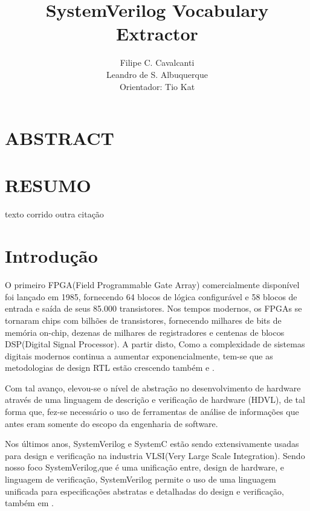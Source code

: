 \documentclass[12pt, twocolumn, a4paper]{article}
\begin{document}
	\title{SystemVerilog Vocabulary Extractor}
	\author{Filipe C. Cavalcanti\\ Leandro de S. Albuquerque\\
	Orientador: Tio Kat}
	\maketitle
	
	\section{ABSTRACT}
	
	\section{RESUMO}
	texto corrido\cite{Antoniol2007}
	outra citação\cite{Alfke1943}
	\section{Introdução}
\quad O primeiro FPGA(Field Programmable Gate Array) comercialmente disponível  foi lançado em 1985, fornecendo 64 blocos de lógica configurável e 58 blocos de entrada e saída de seus 85.000 transistores\cite{Alfke1943}. Nos tempos modernos, os FPGAs se tornaram chips com bilhões de transistores, fornecendo milhares de bits de memória on-chip, dezenas de milhares de registradores e centenas de blocos DSP(Digital Signal Processor)\cite{Marc-Andre}. A partir disto, Como a complexidade de sistemas digitais modernos continua a aumentar exponencialmente, tem-se que as metodologias de design RTL estão crescendo também\cite{Marc-Andre} e \cite{Hahanov2008}.

Com tal avanço, elevou-se o nível de abstração no desenvolvimento de hardware através de uma linguagem de descrição e verificação de hardware (HDVL), de tal forma que, fez-se necessário o uso de ferramentas de análise de informações que antes eram somente do escopo da engenharia de software.

Nos últimos anos, SystemVerilog e SystemC estão sendo extensivamente usadas para design e verificação na industria VLSI(Very Large Scale Integration)\cite{Kumar2014}. Sendo nosso foco SystemVerilog,que é uma unificação entre, design de hardware, e linguagem de verificação\cite{IEEEComputerSociety2013}, SystemVerilog permite o uso de uma linguagem unificada para especificações abstratas e detalhadas do design e verificação, também em \cite{IEEEComputerSociety2013}.
\end{document}
